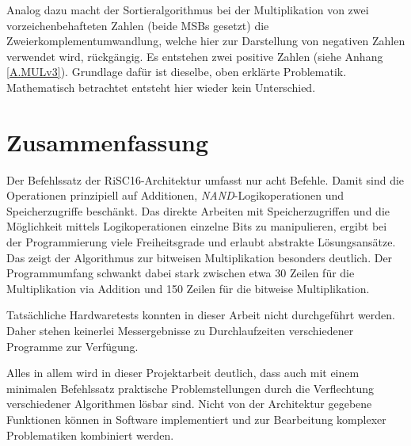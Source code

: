 \documentclass[fleqn, a4paper, 11pt]{article}       %
\begin{document}
Analog dazu macht der Sortieralgorithmus bei der Multiplikation von zwei vorzeichenbehafteten Zahlen (beide MSBs gesetzt) die Zweierkomplementumwandlung, welche hier zur Darstellung von negativen Zahlen verwendet wird, rückgängig. Es entstehen zwei positive Zahlen (siehe Anhang \ref{A.MULv3}). Grundlage dafür ist dieselbe, oben erklärte Problematik. Mathematisch betrachtet entsteht hier wieder kein Unterschied.

\section{Zusammenfassung}
Der Befehlssatz der RiSC16-Architektur umfasst nur acht Befehle. Damit sind die Operationen prinzipiell auf Additionen, \emph{NAND}-Logikoperationen und Speicherzugriffe beschänkt. Das direkte Arbeiten mit Speicherzugriffen und die Möglichkeit mittels Logikoperationen  einzelne Bits zu manipulieren, ergibt bei der Programmierung viele Freiheitsgrade und erlaubt abstrakte Lösungsansätze. Das zeigt der Algorithmus zur bitweisen Multiplikation besonders deutlich. Der Programmumfang schwankt dabei stark zwischen etwa 30 Zeilen für die Multiplikation via Addition und 150 Zeilen für die bitweise Multiplikation. 

Tatsächliche Hardwaretests konnten in dieser Arbeit nicht durchgeführt werden. Daher stehen keinerlei  Messergebnisse zu Durchlaufzeiten verschiedener Programme zur Verfügung.

Alles in allem wird in dieser Projektarbeit deutlich, dass auch mit einem minimalen Befehlssatz praktische Problemstellungen  durch die Verflechtung verschiedener Algorithmen lösbar sind. Nicht von der Architektur gegebene Funktionen können in Software implementiert und zur Bearbeitung komplexer Problematiken kombiniert werden.
\end{document}
